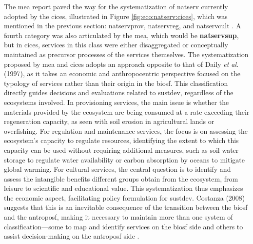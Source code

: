 \documentclass[./main_en.tex]{subfiles}
\begin{document}
\par The \acrshort{mea} report paved the way for the systematization of \gls{natserv} currently adopted by the \acrfull{cices}, illustrated in Figure \ref{fig:eco:natserv:cices}, which was mentioned in the previous section: \gls{natservprov}, \gls{natservreg}, and \gls{natservcult} \cite{Haines-young2018a}. A fourth category was also articulated by the \acrshort{mea}, which would be \textbf{\gls{natservsup}}, but in \acrshort{cices}, services in this class were either disaggregated or conceptually maintained as precursor processes of the services themselves. The systematization proposed by \acrshort{mea} and \acrshort{cices} adopts an approach opposite to that of Daily \textit{et al.} (1997), as it takes an economic and anthropocentric perspective focused on the typology of services rather than their origin in the \gls{biosf}. This classification directly guides decisions and evaluations related to \gls{sustdev}, regardless of the ecosystems involved. In provisioning services, the main issue is whether the materials provided by the ecosystem are being consumed at a rate exceeding their regeneration capacity, as seen with soil erosion in agricultural lands or overfishing. For regulation and maintenance services, the focus is on assessing the ecosystem's capacity to regulate resources, identifying the extent to which this capacity can be used without requiring additional measures, such as soil water storage to regulate water availability or carbon absorption by oceans to mitigate global warming. For cultural services, the central question is to identify and assess the intangible benefits different groups obtain from the ecosystem, from leisure to scientific and educational value. This systematization thus emphasizes the economic aspect, facilitating policy formulation for \gls{sustdev}. Costanza (2008) suggests that this is an inevitable consequence of the transition between the \gls{biosf} and the \gls{antroposf}, making it necessary to maintain more than one \gls{system} of classification—some to map and identify services on the \gls{biosf} side and others to assist decision-making on the \gls{antroposf} side \cite{costanza2008}.
\end{document}
